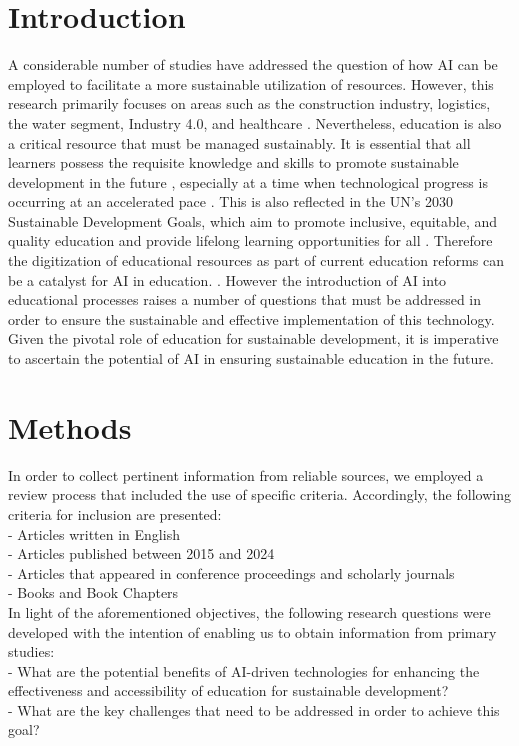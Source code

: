 \documentclass[]{lni}
\begin{document}
\section{Introduction}
%
A considerable number of studies have addressed the question of how AI can be employed to facilitate a more sustainable utilization of resources. However, 
this research primarily focuses on areas such as the construction industry, logistics, the water segment, Industry 4.0, and healthcare 
\cite{KAR2022134120}.
Nevertheless, education is also a critical resource that must be managed sustainably. It is essential that all learners possess the requisite knowledge and 
skills to promote sustainable development in the future 
\cite{OFlaherty2018},
 especially at a time when technological progress is occurring at an accelerated pace \cite{Judijanto2022}.
This is also reflected in the UN's 2030 Sustainable Development Goals, which aim to promote inclusive, equitable, and quality education and provide 
lifelong learning opportunities for all
\cite{un_sdg4}. 
Therefore the digitization of educational resources as part of current education reforms can be a catalyst for AI in education. \cite{KAMYAB2023101566} \cite{cai2021review}.
However the introduction of AI into educational processes raises a number of questions that must be addressed in order to ensure the 
sustainable and effective implementation of this technology.
Given the pivotal role of education for sustainable development, it is imperative to ascertain the potential of AI in ensuring sustainable education in the future.
%
%
%
\section{Methods}
In order to collect pertinent information from reliable sources, we employed a review process that included the use of specific criteria. 
Accordingly, the following criteria for inclusion are presented:\\
- Articles written in English \\
- Articles published between 2015 and 2024\\
- Articles that appeared in conference proceedings and scholarly journals \\
- Books and Book Chapters \\ %

In light of the aforementioned objectives, the following research questions were developed with the intention of enabling us to obtain information from primary studies: \\
- What are the potential benefits of AI-driven technologies for enhancing the effectiveness and accessibility of education for sustainable development?\\ 
- What are the key challenges that need to be addressed in order to achieve this goal?
%
%
%
\end{document}
